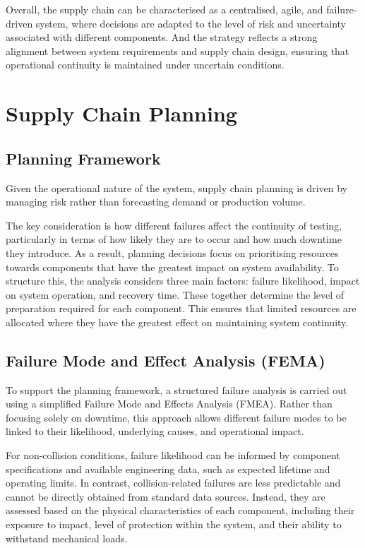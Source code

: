 Overall, the supply chain can be characterised as a centralised, agile, and failure-driven system, where decisions are adapted to the level of risk and uncertainty associated with different components. And the strategy reflects a strong alignment between system requirements and supply chain design, ensuring that operational continuity is maintained under uncertain conditions.

\section{Supply Chain Planning}

\subsection{Planning Framework}

Given the operational nature of the system, supply chain planning is driven by managing risk rather than forecasting demand or production volume.

The key consideration is how different failures affect the continuity of testing, particularly in terms of how likely they are to occur and how much downtime they introduce. As a result, planning decisions focus on prioritising resources towards components that have the greatest impact on system availability.  To structure this, the analysis considers three main factors: failure likelihood, impact on system operation, and recovery time. These together determine the level of preparation required for each component. This ensures that limited resources are allocated where they have the greatest effect on maintaining system continuity.

\subsection{Failure Mode and Effect Analysis (FEMA)}

To support the planning framework, a structured failure analysis is carried out using a simplified Failure Mode and Effects Analysis (FMEA)\cite{FMEA_lecture_notes}. Rather than focusing solely on downtime, this approach allows different failure modes to be linked to their likelihood, underlying causes, and operational impact.

For non-collision conditions, failure likelihood can be informed by component specifications and available engineering data, such as expected lifetime and operating limits. In contrast, collision-related failures are less predictable and cannot be directly obtained from standard data sources. Instead, they are assessed based on the physical characteristics of each component, including their exposure to impact, level of protection within the system, and their ability to withstand mechanical loads.

